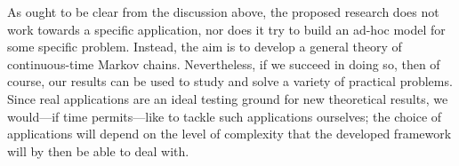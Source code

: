 \documentclass[11pt,dvipsnames,usenames,a4paper]{article}
\begin{document}
As ought to be clear from the discussion above, the proposed research does not work towards a specific application, nor does it try to build an ad-hoc model for some specific problem.
Instead, the aim is to develop a general theory of continuous-time Markov chains.
Nevertheless, if we succeed in doing so, then of course, our results can be used to study and solve a variety of practical problems. Since real applications are an ideal testing ground for new theoretical results, we would---if time permits---like to tackle such applications ourselves; the choice of applications will depend on the level of complexity that the developed framework will by then be able to deal with.







\end{document}
